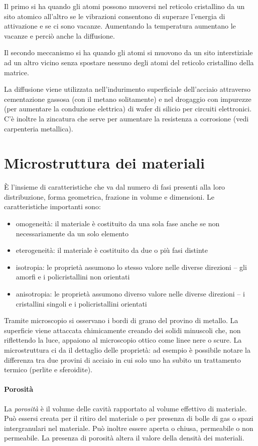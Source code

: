 \documentclass[a5paper,12pt]{article}
\newcommand{\e}{\`E\xspace}  %
\begin{document}
Il primo si ha quando gli atomi possono muoversi nel reticolo cristallino da un sito atomico all'altro se le vibrazioni consentono di superare l'energia di attivazione e se ci sono vacanze. Aumentando la temperatura aumentano le vacanze e perciò anche la diffusione.

Il secondo meccanismo si ha quando gli atomi si muovono da un sito interstiziale ad un altro vicino senza spostare nessuno degli atomi del reticolo cristallino della matrice.

La diffusione viene utilizzata nell'indurimento superficiale dell'acciaio attraverso cementazione gassosa (con il metano solitamente) e nel drogaggio con impurezze (per aumentare la conduzione elettrica) di wafer di silicio per circuiti elettronici. C'è inoltre la zincatura che serve per aumentare la resistenza a corrosione (vedi carpenteria metallica).
\section{Microstruttura dei materiali}
\e l'insieme di caratteristiche che va dal numero di fasi presenti alla loro distribuzione, forma geometrica, frazione in volume e dimensioni. Le caratteristiche importanti sono:
\begin{itemize}
	\item omogeneità: il materiale è costituito da una sola fase anche se non necessariamente da un solo elemento
	\item eterogeneità: il materiale è costituito da due o più fasi distinte
	\item isotropia: le proprietà assumono lo stesso valore nelle diverse direzioni -- gli amorfi e i policristallini non orientati
	\item anisotropia: le proprietà assumono diverso valore nelle diverse direzioni -- i cristallini singoli e i policristallini orientati
\end{itemize}
Tramite microscopio si osservano i bordi di grano del provino di metallo. La superficie viene attaccata chimicamente creando dei solidi minuscoli che, non riflettendo la luce, appaiono al microscopio ottico come linee nere o scure. La microstruttura ci da il dettaglio delle proprietà: ad esempio è possibile notare la differenza tra due provini di acciaio in cui solo uno ha subito un trattamento termico (perlite e sferoidite).
\paragraph{Porosità}
La \emph{porosità} è il volume delle cavità rapportato al volume effettivo di materiale. Può essersi creata per il ritiro del materiale o per presenza di bolle di gas o spazi intergranulari nel materiale. Può inoltre essere aperta o chiusa, permeabile o non permeabile. La presenza di porosità altera il valore della densità dei materiali.
\end{document}
